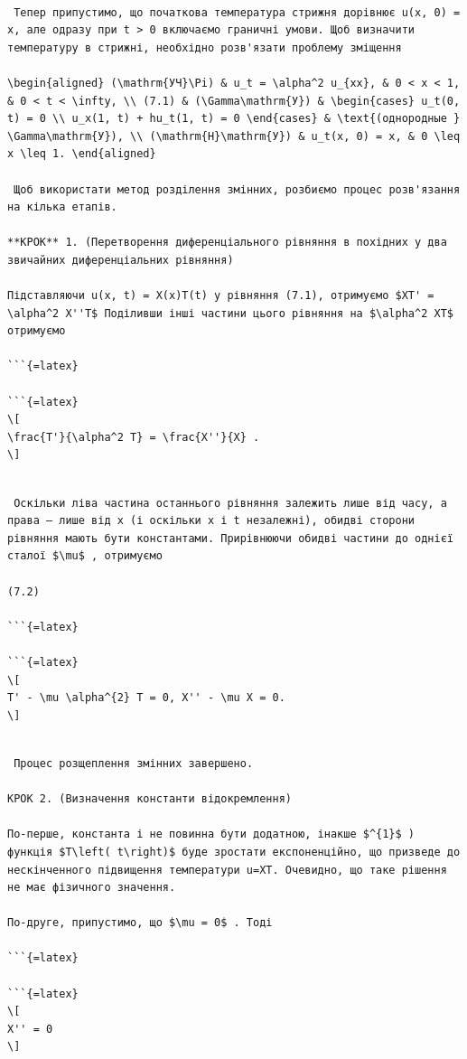 \documentclass[
  ukrainian,
]{article}
\begin{document}
\begin{verbatim}

 Тепер припустимо, що початкова температура стрижня дорівнює u(x, 0) = x, але одразу при t > 0 включаємо граничні умови. Щоб визначити температуру в стрижні, необхідно розв'язати проблему зміщення

\begin{aligned} (\mathrm{УЧ}\Pi) & u_t = \alpha^2 u_{xx}, & 0 < x < 1, & 0 < t < \infty, \\ (7.1) & (\Gamma\mathrm{У}) & \begin{cases} u_t(0, t) = 0 \\ u_x(1, t) + hu_t(1, t) = 0 \end{cases} & \text{(однородные } \Gamma\mathrm{У}), \\ (\mathrm{H}\mathrm{У}) & u_t(x, 0) = x, & 0 \leq x \leq 1. \end{aligned}

 Щоб використати метод розділення змінних, розбиємо процес розв'язання на кілька етапів.

**КРОК** 1. (Перетворення диференціального рівняння в похідних у два звичайних диференціальних рівняння)

Підставляючи u(x, t) = X(x)T(t) у рівняння (7.1), отримуємо $XT' = \alpha^2 X''T$ Поділивши інші частини цього рівняння на $\alpha^2 XT$ отримуємо

```{=latex}

```{=latex}
\[
\frac{T'}{\alpha^2 T} = \frac{X''}{X} .
\]
\end{verbatim}

\begin{verbatim}

 Оскільки ліва частина останнього рівняння залежить лише від часу, а права — лише від x (і оскільки x і t незалежні), обидві сторони рівняння мають бути константами. Прирівнюючи обидві частини до однієї сталої $\mu$ , отримуємо

(7.2)

```{=latex}

```{=latex}
\[
T' - \mu \alpha^{2} T = 0, X'' - \mu X = 0.
\]
\end{verbatim}

\begin{verbatim}

 Процес розщеплення змінних завершено.

КРОК 2. (Визначення константи відокремлення)

По-перше, константа і не повинна бути додатною, інакше $^{1}$ ) функція $T\left( t\right)$ буде зростати експоненційно, що призведе до нескінченного підвищення температури u=XT. Очевидно, що таке рішення не має фізичного значення.

По-друге, припустимо, що $\mu = 0$ . Тоді

```{=latex}

```{=latex}
\[
X'' = 0
\]
\end{verbatim}
\end{document}
